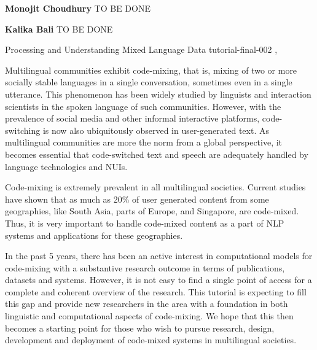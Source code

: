 \begin{bio}

\textbf{Monojit Choudhury} TO BE DONE

\textbf{Kalika Bali} TO BE DONE

\end{bio}

\begin{tutorial}
  {Processing and Understanding Mixed Language Data}
  {tutorial-final-002}
  {\daydateyear, \tutorialmorningtime}
  {\TutLocB}

Multilingual communities exhibit code-mixing, that is, mixing of two or more socially stable languages in a single conversation, sometimes even in a single utterance. This phenomenon has been widely studied by linguists and interaction scientists in the spoken language of such communities. However, with the prevalence of social media and other informal interactive platforms, code-switching is now also ubiquitously observed in user-generated text. As multilingual communities are more the norm from a global perspective, it becomes essential that code-switched text and speech are adequately handled by language technologies and NUIs.

Code-mixing is extremely prevalent in all multilingual societies. Current studies have shown that as much as 20\% of user generated content from some geographies, like South Asia, parts of Europe, and Singapore, are code-mixed. Thus, it is very important to handle code-mixed content as a part of NLP systems and applications for these geographies.

In the past 5 years, there has been an active interest in computational models for code-mixing with a substantive research outcome in terms of publications, datasets and systems. However, it is not easy to find a single point of access for a complete and coherent overview of the research. This tutorial is expecting to fill this gap and provide new researchers in the area with a foundation in both linguistic and computational aspects of code-mixing. We hope that this then becomes a starting point for those who wish to pursue research, design, development and deployment of code-mixed systems in multilingual societies.

\end{tutorial}
